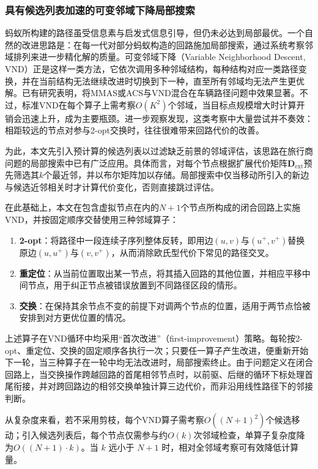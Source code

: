 \documentclass[lettersize,journal]{IEEEtran}
\begin{document}
\subsubsection{具有候选列表加速的可变邻域下降局部搜索}
\label{subsec:vnd}
蚂蚁所构建的路径虽受信息素与启发式信息引导，但仍未必达到局部最优。一个自然的改进思路是：在每一代对部分蚂蚁构造的回路施加局部搜索，通过系统考察邻域排列来进一步精化解的质量。可变邻域下降（Variable Neighborhood Descent, VND）\textcolor{blue}{\cite{ref24}}正是这样一类方法，它依次调用多种邻域结构，每种结构对应一类路径变换，并在当前结构无法继续改进时切换到下一种，直至所有邻域均无法产生更优解。已有研究表明，将MMAS或ACS与VND混合在车辆路径问题中效果显著\textcolor{blue}{\cite{ref25}}。不过，标准VND在每个算子上需考察$O(K^2)$个邻域，当目标点规模增大时计算开销会迅速上升，成为主要瓶颈。进一步观察发现，这类考察中大量尝试并不奏效：相距较远的节点对参与2-opt交换时，往往很难带来回路代价的改善。

为此，本文先引入预计算的候选列表以过滤缺乏前景的邻域评估，该思路在旅行商问题的局部搜索中已有广泛应用\textcolor{blue}{\cite{ref26}}。具体而言，对每个节点根据扩展代价矩阵$\mathbf{D}_{\mathrm{ext}}$预先筛选其$k$个最近邻，并以布尔矩阵加以存储。局部搜索中仅当移动所引入的新边与候选近邻相关时才计算代价变化，否则直接跳过评估。

在此基础上，本文在包含虚拟节点在内的$N+1$个节点所构成的闭合回路上实施VND，并按固定顺序交替使用三种邻域算子：
\begin{enumerate}
\item \textbf{2-opt}：将路径中一段连续子序列整体反转，即用边$(u, v)$与$(u^{+}, v^{+})$替换原边$(u, u^{+})$与$(v, v^{+})$，从而消除欧氏型代价下常见的路径交叉。
\item \textbf{重定位}：从当前位置取出某一节点，将其插入回路的其他位置，并相应平移中间节点，用于纠正节点被错误放置到不同路径区段的情形。
\item \textbf{交换}：在保持其余节点不变的前提下对调两个节点的位置，适用于两节点恰被安排到对方更优位置的情况。
\end{enumerate}
上述算子在VND循环中均采用“首次改进”（first-improvement）策略。每轮按2-opt、重定位、交换的固定顺序各执行一次；只要任一算子产生改进，便重新开始下一轮，当三种算子在一轮中均无法改进时，局部搜索终止。由于问题定义在闭合回路上，当交换操作跨越回路的首尾相邻节点时，以前驱、后继的循环下标处理首尾衔接，并对跨回路边的相邻交换单独计算三边代价，而非沿用线性路径下的邻接判断。

从复杂度来看，若不采用剪枝，每个VND算子需考察$O((N+1)^2)$个候选移动；引入候选列表后，每个节点仅需参与约$O(k)$次邻域检查，单算子复杂度降为$O((N+1)\cdot k)$。当 $k$ 远小于 $N+1$ 时，相对全邻域考察可有效降低计算量。
\end{document}

